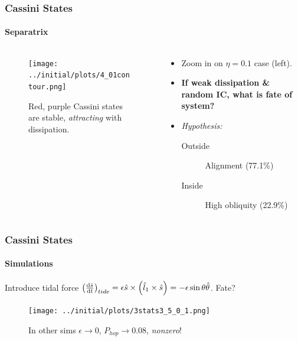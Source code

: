 \documentclass[dvipsnames]{beamer}
\newcommand*{\rd}[2]{\frac{\mathrm{d}#1}{\mathrm{d}#2}}
\DeclarePairedDelimiter\p{\lparen}{\rparen}
\begin{document}
\begin{frame}
    \frametitle{Cassini States}
    \framesubtitle{Separatrix}

    \begin{columns}
        \begin{column}{0.45\textwidth}
            \begin{figure}[t]
                \centering
                \texttt{[image: ../initial/plots/4\_01contour.png]}
                \caption{Red, purple Cassini states are stable,
                \emph{attracting} with dissipation.}
            \end{figure}
        \end{column}
        \begin{column}{0.45\textwidth}
            \begin{itemize}
                \item Zoom in on $\eta = 0.1$ case (left).

                \item \textbf{If weak dissipation \& random IC,
                    what is fate of system?}

                \item \emph{Hypothesis:}
                    \begin{description}
                        \item[Outside] Alignment (77.1\%)
                        \item[Inside] High obliquity (22.9\%)
                    \end{description}
            \end{itemize}
        \end{column}
    \end{columns}
\end{frame}

\begin{frame}
    \frametitle{Cassini States}
    \framesubtitle{Simulations}

    Introduce tidal force $\p*{\rd{\hat{s}}{t}}_{tide} = \epsilon \hat{s} \times
    \p*{\hat{l}_1 \times \hat{s}} = -\epsilon \sin\theta\hat{\theta}$. Fate?

    \begin{figure}[t]
        \centering
        \texttt{[image: ../initial/plots/3stats3\_5\_0\_1.png]}
        \caption{In other sims $\epsilon \to 0$, $P_{hop} \to 0.08$, \emph{nonzero}!}
    \end{figure}
\end{frame}
\end{document}
